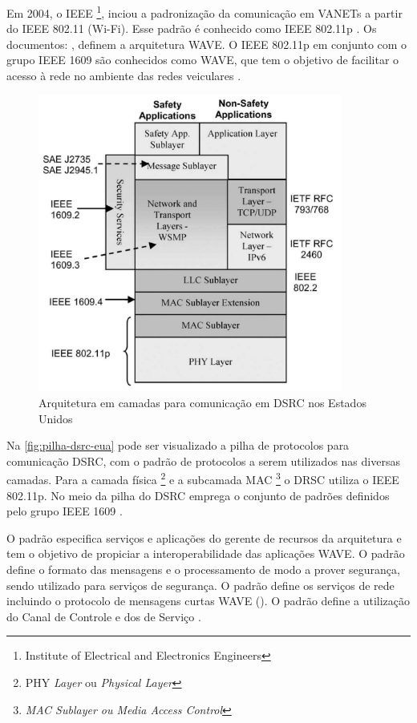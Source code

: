 \documentclass[mestrado, pre-defesa, english, brazil]{packages/icmc}
\begin{document}
Em 2004, o IEEE \footnote{Institute of Electrical and Electronics Engineers}, inciou a padronização da comunicação em VANETs a partir do IEEE 802.11 (Wi-Fi). Esse padrão é conhecido como IEEE 802.11p . Os documentos: \citeauthor{IEEE-Std-802.11,IEEE-Std-802.11p,IEEE-Std-1609.1,IEEE-Std-1609.2,IEEE-Std-1609.3,IEEE-Std-1609.4}, definem a arquitetura WAVE. O IEEE 802.11p em conjunto com o grupo IEEE 1609 são conhecidos como WAVE, que tem o objetivo de facilitar o acesso à rede no ambiente das redes veiculares \cite{kenney-2011,Alves-2009,sattari-2012,Yokoyama-2014}.

\begin{figure}[!htbp]
	\centering
	\caption{\label{fig:pilha-dsrc-eua} Arquitetura em camadas para comunicação em DSRC nos Estados Unidos}
	\includegraphics[width=10cm]{img/pilha-dsrc-eua.jpeg}
\end{figure}

Na \autoref{fig:pilha-dsrc-eua} pode ser visualizado a pilha de protocolos para comunicação DSRC, com o padrão de protocolos a serem utilizados nas diversas camadas. Para a camada física \footnote{PHY \textit{Layer} ou \textit{Physical Layer}} e a 
subcamada MAC \footnote{\textit{MAC Sublayer ou Media Access Control}} o DRSC utiliza o IEEE 802.11p. No meio da pilha do DSRC emprega o conjunto de padrões definidos pelo grupo IEEE 1609 \cite{li-2012,kenney-2011}.

O padrão \citeauthor{IEEE-Std-1609.1} especifica serviços e aplicações do gerente de recursos da arquitetura e tem o objetivo de propiciar a interoperabilidade das aplicações WAVE. O padrão \citeauthor{IEEE-Std-1609.2} define o formato das mensagens e o processamento de modo a prover segurança, sendo utilizado para serviços de segurança. O padrão \citeauthor{IEEE-Std-1609.3} define os serviços de rede incluindo o protocolo de mensagens curtas WAVE (). O padrão \citeauthor{IEEE-Std-1609.4} define a utilização do Canal de Controle e dos de Serviço \cite{kenney-2011,Alves-2009}.
\end{document}
